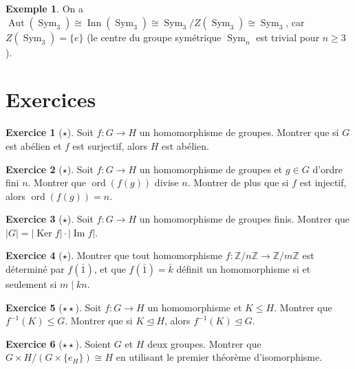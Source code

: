 \documentclass[12pt,a4paper,openany]{book}
\theoremstyle{definition}
\newtheorem{exemple}{Exemple}[chapter]
\newtheorem{exercice}{Exercice}[chapter]
\newcommand{\Z}{\mathbb{Z}}
\DeclareMathOperator{\Sym}{Sym}
\DeclareMathOperator{\Aut}{Aut}
\DeclareMathOperator{\Inn}{Inn}
\DeclareMathOperator{\Ker}{Ker}
\renewcommand{\Im}{\operatorname{Im}}
\DeclareMathOperator{\ord}{ord}
\begin{document}
\begin{exemple}\label{ex:aut-S3}
  On a $\Aut(\Sym_3)\cong\Inn(\Sym_3)\cong\Sym_3/Z(\Sym_3)\cong\Sym_3$,
  car $Z(\Sym_3)=\{e\}$ (le centre du groupe symétrique $\Sym_n$ est
  trivial pour $n\geq 3$).
\end{exemple}

\section{Exercices}\label{sec:exo-ch3}

\begin{exercice}[$\star$]\label{exo:hom-trivial}
  Soit $f\colon G\to H$ un homomorphisme de groupes. Montrer que si
  $G$ est abélien et $f$ est surjectif, alors $H$ est abélien.
\end{exercice}

\begin{exercice}[$\star$]\label{exo:hom-ordre}
  Soit $f\colon G\to H$ un homomorphisme de groupes et $g\in G$
  d'ordre fini $n$. Montrer que $\ord(f(g))$ divise $n$.
  Montrer de plus que si $f$ est injectif, alors $\ord(f(g))=n$.
\end{exercice}

\begin{exercice}[$\star$]\label{exo:ker-image-fini}
  Soit $f\colon G\to H$ un homomorphisme de groupes finis.
  Montrer que $|G| = |\Ker f|\cdot|\Im f|$.
\end{exercice}

\begin{exercice}[$\star$]\label{exo:hom-cyclique}
  Montrer que tout homomorphisme $f\colon\Z/n\Z\to\Z/m\Z$ est
  déterminé par $f(\bar{1})$, et que $f(\bar{1})=\bar{k}$ définit un
  homomorphisme si et seulement si $m\mid kn$.
\end{exercice}

\begin{exercice}[$\star\star$]\label{exo:image-reciproque}
  Soit $f\colon G\to H$ un homomorphisme et $K\leq H$.
  Montrer que $f^{-1}(K)\leq G$.
  Montrer que si $K\trianglelefteq H$, alors $f^{-1}(K)\trianglelefteq G$.
\end{exercice}

\begin{exercice}[$\star\star$]\label{exo:produit-direct-quotient}
  Soient $G$ et $H$ deux groupes. Montrer que
  $G\times H / (G\times\{e_H\}) \cong H$
  en utilisant le premier théorème d'isomorphisme.
\end{exercice}
\end{document}
